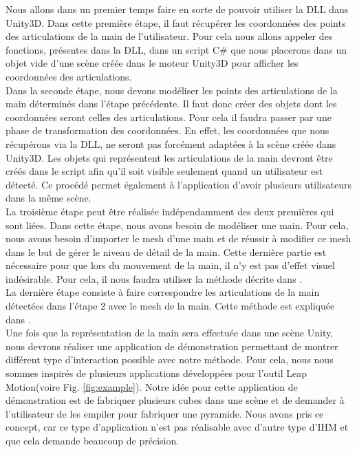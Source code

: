 Nous allons dans un premier temps faire en sorte de pouvoir utiliser la DLL dans Unity3D.
Dans cette première étape, il faut récupérer les coordonnées des points des articulations
de la main de l'utilisateur. Pour cela nous allons appeler des fonctions, présentes dans la DLL, dans un 
script C\# que nous placerons dans un objet vide d'une scène créée dans le moteur Unity3D pour
afficher les coordonnées des articulations.\\

Dans la seconde étape, nous devons modéliser les points des articulations de la main déterminés 
dans l'étape précédente. Il faut donc créer des objets dont les coordonnées seront celles des articulations.
Pour cela il faudra passer par une phase de transformation des coordonnées. En effet, les coordonnées
que nous récupérons via la DLL, ne seront pas forcément adaptées à la scène créée dans Unity3D. Les 
objets qui représentent les articulations de la main devront être créés dans le script afin qu'il 
soit visible seulement quand un utilisateur est détecté. Ce procédé permet également à l'application
d'avoir plusieurs utilisateurs dans la même scène.\\

La troisième étape peut être réalisée indépendamment des deux premières qui sont liées. Dans cette étape,
nous avons besoin de modéliser une main. Pour cela, nous avons besoin d'importer le mesh d'une main et
de réussir à modifier ce mesh dans le but de gérer le niveau de détail de la main. Cette dernière
partie est nécessaire pour que lors du mouvement de la main, il n'y est pas d'effet visuel indésirable.
Pour cela, il nous faudra utiliser la méthode décrite dans \cite{export:217428}.\\

La dernière étape consiste à faire correspondre les articulations de la main détectées dans l'étape 2 avec
le mesh de la main. Cette méthode est expliquée dans \cite{export:217428}.\\

Une fois que la représentation de la main sera effectuée dans une scène Unity, nous devrons réaliser une 
application de démonstration permettant de montrer différent type d'interaction possible avec notre 
méthode. Pour cela, nous nous sommes inspirés de plusieurs applications développées pour l'outil
Leap Motion(voire Fig. \ref{fig:example}). Notre idée pour cette application de démonstration est de fabriquer plusieurs cubes dans 
une scène et de demander à l'utilisateur de les empiler pour fabriquer une pyramide. Nous avons pris
ce concept, car ce type d'application n'est pas réalisable avec d'autre type d'IHM et que cela demande
beaucoup de précision.


